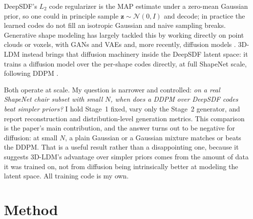 \documentclass[11pt]{article}
\begin{document}
DeepSDF's $L_2$ code regularizer is the MAP estimate under a zero-mean Gaussian
prior, so one could in principle sample $\mathbf{z}\sim\mathcal{N}(0,I)$ and
decode; in practice the learned codes do not fill an isotropic Gaussian and naive
sampling breaks. Generative shape modeling has largely tackled this by working
directly on point clouds or voxels, with GANs and VAEs
\citep{achlioptas2018latentpc} and, more recently, diffusion models
\citep{poole2022dreamfusion}. 3D-LDM \citep{nam2022lion3dldm} instead brings
that diffusion machinery inside the DeepSDF latent space: it trains a
diffusion model over the per-shape codes directly, at full ShapeNet scale,
following DDPM \citep{ho2020ddpm}.

Both operate at scale. My question is narrower and controlled: \emph{on a real
ShapeNet chair subset with small $N$, when does a DDPM over DeepSDF codes beat
simpler priors?} I hold Stage~1 fixed, vary only the Stage~2 generator, and
report reconstruction and distribution-level generation metrics. This
comparison is the paper's main contribution, and the answer turns out to be
negative for diffusion: at small $N$, a plain Gaussian or a Gaussian mixture
matches or beats the DDPM. That is a useful result rather than a disappointing
one, because it suggests 3D-LDM's advantage over simpler priors comes from the
amount of data it was trained on, not from diffusion being intrinsically
better at modeling the latent space. All training code is my own.

\section{Method}
\end{document}
